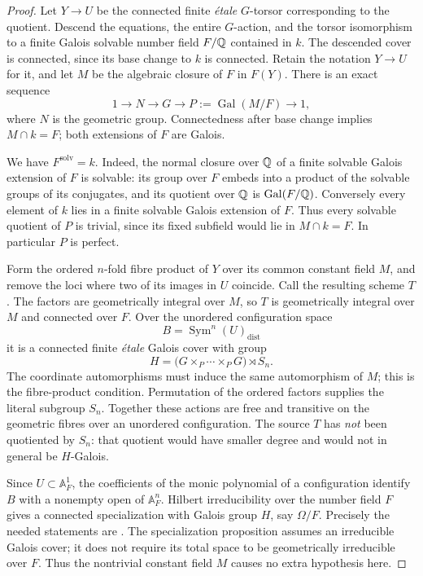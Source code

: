 \begin{proof}
Let $Y\to U$ be the connected finite \emph{\'etale} $G$-torsor
corresponding to the quotient. Descend the equations, the entire
$G$-action, and the torsor isomorphism to a finite Galois solvable
number field $F/\mathbb Q$ contained in $k$. The descended cover is
connected, since its base change to $k$ is connected. Retain the
notation $Y\to U$ for it, and let $M$ be the algebraic closure of
$F$ in $F(Y)$. There is an exact sequence
\[
 1\longrightarrow N\longrightarrow G\longrightarrow
 P:=\operatorname{Gal}(M/F)\longrightarrow1,
\]
where $N$ is the geometric group. Connectedness after base change
implies $M\cap k=F$; both extensions of $F$ are Galois.

We have $F^{\mathrm{solv}}=k$. Indeed, the normal closure over
$\mathbb Q$ of a finite solvable Galois extension of $F$ is solvable:
its group over $F$ embeds into a product of the solvable groups
of its conjugates, and its quotient over $\mathbb Q$ is
$\operatorname{Gal}(F/\mathbb Q)$. Conversely every element of $k$
lies in a finite solvable Galois extension of $F$. Thus every
solvable quotient of $P$ is trivial, since its fixed subfield
would lie in $M\cap k=F$. In particular $P$ is perfect.

Form the ordered $n$-fold fibre product of $Y$ over its common
constant field $M$, and remove the loci where two of its images
in $U$ coincide. Call the resulting scheme $T$. The factors are
geometrically integral over $M$, so $T$ is geometrically integral
over $M$ and connected over $F$. Over the unordered configuration
space
\[
 B=\operatorname{Sym}^n(U)_{\mathrm{dist}}
\]
it is a connected finite \emph{\'etale} Galois cover with group
\begin{equation}\label{eq:F20:common_constant_wreath}
 H=\bigl(G\times_P\cdots\times_PG\bigr)\rtimes S_n.
\end{equation}
The coordinate automorphisms must induce the same automorphism of
$M$; this is the fibre-product condition. Permutation of the
ordered factors supplies the literal subgroup $S_n$. Together
these actions are free and transitive on the geometric fibres
over an unordered configuration. The source $T$ has \emph{not}
been quotiented by $S_n$: that quotient would have smaller degree
and would not in general be $H$-Galois.

Since $U\subset\mathbb A^1_F$, the coefficients of the monic
polynomial of a configuration identify $B$ with a nonempty open
of $\mathbb A^n_F$. Hilbert irreducibility over the number field
$F$ gives a connected specialization with Galois group $H$, say
$\Omega/F$. Precisely the needed statements are
\citet[Proposition~3.3.1 and Theorem~3.4.1, pp.~23, 25]{F_Serre2007}.
The specialization proposition assumes an irreducible Galois
cover; it does not require its total space to be geometrically
irreducible over $F$. Thus the nontrivial constant field $M$
causes no extra hypothesis here.


\end{proof}
